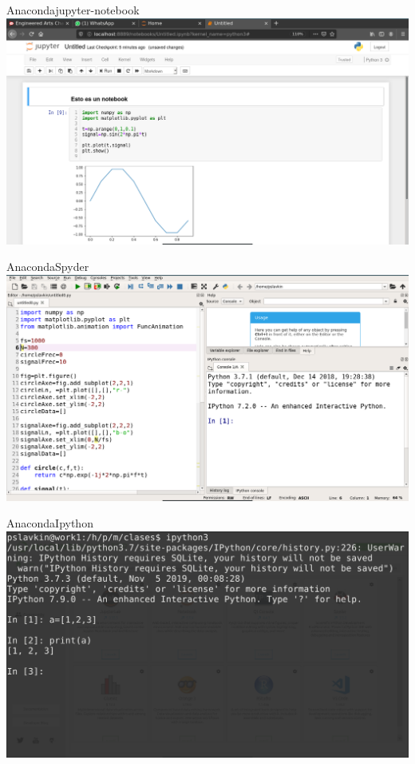  \begin{frame}{Anaconda}{jupyter-notebook}
       \center\includegraphics[width=1\textwidth]{python/jupyter}
    \vfill
 \end{frame}
 \begin{frame}{Anaconda}{Spyder}
       \center\includegraphics[width=1\textwidth]{python/spyder}
    \vfill
 \end{frame}
 \begin{frame}{Anaconda}{Ipython}
       \center\includegraphics[width=1\textwidth]{python/ipython}
    \vfill
 \end{frame}



